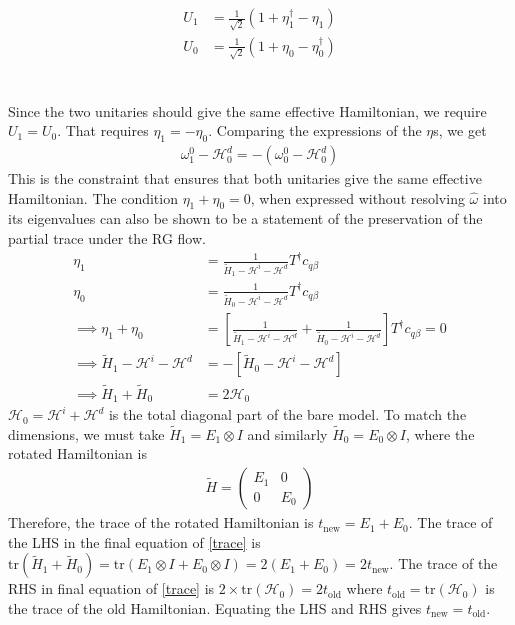 \documentclass[twoside,11pt]{report}
\numberwithin{equation}{section}
\begin{document}
\begin{equation}\begin{aligned}
	U_1 &= \frac{1}{\sqrt 2}\left(1 + \eta_1^\dagger - \eta_1\right)\\
	U_0 &= \frac{1}{\sqrt 2}\left(1 + \eta_0 - \eta_0^\dagger\right)
\end{aligned}\end{equation}
\\\\Since the two unitaries should give the same effective Hamiltonian, we require \(U_1 = U_0\). That requires \(\eta_1 = -\eta_0\). Comparing the expressions of the \(\eta\)s, we get
\begin{equation}\begin{aligned}
	\omega_1^0 - \mathcal{H}^d_0 = -\left(\omega_0^0 - \mathcal{H}^d_0\right)
\end{aligned}\end{equation}
This is the constraint that ensures that both unitaries give the same effective Hamiltonian. The condition \(\eta_1 + \eta_0 = 0\), when expressed without resolving \(\hat \omega\) into its eigenvalues can also be shown to be a statement of the preservation of the partial trace under the RG flow.
\begin{equation}\begin{aligned}
	\label{trace}
\eta_1 &= \frac{1}{\tilde H_1 - \mathcal{H}^i - \mathcal{H}^d}T^\dagger c_{q\beta}\\
\eta_0 &= \frac{1}{\tilde H_0 - \mathcal{H}^i - \mathcal{H}^d}T^\dagger c_{q\beta}\\
\implies  \eta_1 + \eta_0 &= \left[\frac{1}{\tilde H_1 - \mathcal{H}^i - \mathcal{H}^d} + \frac{1}{\tilde H_0 - \mathcal{H}^i - \mathcal{H}^d}\right]T^\dagger c_{q\beta} = 0\\
\implies \tilde H_1 - \mathcal{H}^i - \mathcal{H}^d &= -\left[\tilde H_0 - \mathcal{H}^i - \mathcal{H}^d\right]\\
\implies \tilde H_1 + \tilde H_0 &= 2\mathcal{H}_0
\end{aligned}\end{equation}
\(\mathcal{H}_0 = \mathcal{H}^i + \mathcal{H}^d\) is the total diagonal part of the bare model. To match the dimensions, we must take \(\tilde H_1 = E_1 \otimes I\) and similarly \(\tilde H_0 = E_0 \otimes I\), where the rotated Hamiltonian is
\begin{equation}\begin{aligned}
\tilde H = \begin{pmatrix} E_1 & 0 \\ 0 & E_0\end{pmatrix}
\end{aligned}\end{equation}
Therefore, the trace of the rotated Hamiltonian is \(t_\text{new} = E_1 + E_0 \). The trace of the LHS in the final equation of \ref{trace} is \(\text{tr}\left(\tilde H_1 + \tilde H_0\right) = \text{tr}\left(E_1 \otimes I + E_0 \otimes I\right) = 2\left(E_1 + E_0\right) = 2t_\text{new}\). The trace of the RHS in final equation of \ref{trace} is \(2\times\text{tr}\left(\mathcal{H}_0\right) = 2t_\text{old}\) where \(t_\text{old} = \text{tr}\left(\mathcal{H}_0\right)\) is the trace of the old Hamiltonian. Equating the LHS and RHS gives \(t_\text{new} = t_\text{old}\).
\end{document}
